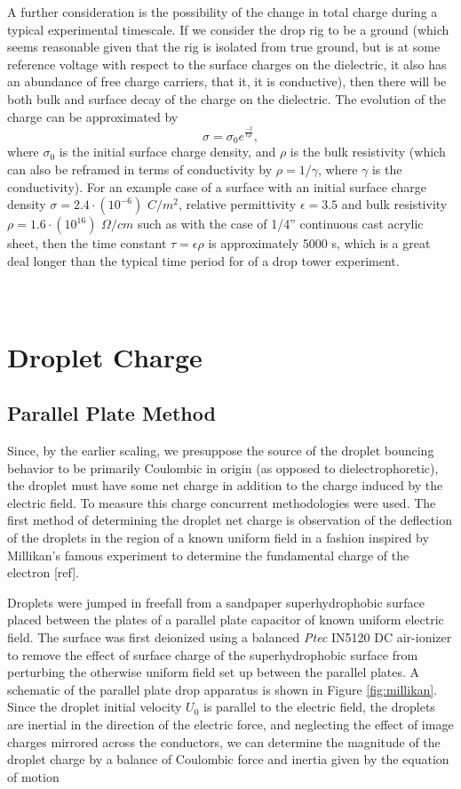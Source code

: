 \documentclass[a4paper, 12pt]{article}
\begin{document}
A further consideration is the possibility of the change in total charge during a typical experimental timescale. If we consider the drop rig to be a ground (which seems reasonable given that the rig is isolated from true ground, but is at some reference voltage with respect to the surface charges on the dielectric, it also has an abundance of free charge carriers, that it, it is conductive), then there will be both bulk and surface decay of the charge on the dielectric. The evolution of the charge can be approximated by
\[ \sigma = \sigma_0 e^{\frac{-t}{\epsilon \rho}}, \]
where $\sigma_0$ is the initial surface charge density, and $\rho$ is the bulk resistivity (which can also be reframed in terms of conductivity by $\rho = 1/\gamma$, where $\gamma$ is the conductivity). For an example case of a surface with an initial surface charge density $\sigma = 2.4 \cdot (10^{-6})$ $C/m^2$, relative permittivity $\epsilon = 3.5$ and bulk resistivity $\rho = 1.6 \cdot (10^{16})$ $\Omega/cm$ such as with the case of 1/4'' continuous cast acrylic sheet, then the time constant $\tau = \epsilon \rho$ is approximately 5000 s, which is a great deal longer than the typical time period for of a drop tower experiment.

\section{\\Droplet Charge} \label{sec.drop_charge}
\subsection*{Parallel Plate Method}
Since, by the earlier scaling, we presuppose the source of the droplet bouncing behavior to be primarily Coulombic in origin (as opposed to dielectrophoretic), the droplet must have some net charge in addition to the charge induced by the electric field. To measure this charge concurrent methodologies were used. The first method of determining the droplet net charge is observation of the deflection of the droplets in the region of a known uniform field in a fashion inspired by Millikan's famous experiment to determine the fundamental charge of the electron [ref].

Droplets were jumped in freefall from a sandpaper superhydrophobic surface placed between the plates of a parallel plate capacitor of known uniform electric field. The surface was first deionized using a balanced \emph{Ptec} IN5120 DC air-ionizer to remove the effect of surface charge of the superhydrophobic surface from perturbing the otherwise uniform field set up between the parallel plates. A schematic of the parallel plate drop apparatus is shown in Figure \ref{fig:millikan}. Since the droplet initial velocity $U_0$ is parallel to the electric field, the droplets are inertial in the direction of the electric force, and neglecting the effect of image charges mirrored across the conductors, we can determine the magnitude of the droplet charge by a balance of Coulombic force and inertia given by the equation of motion
\end{document}
